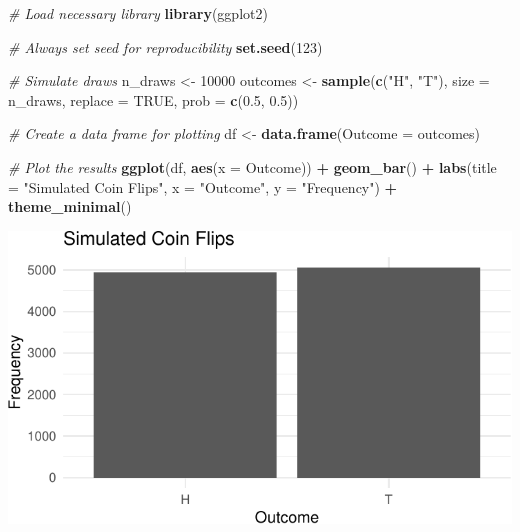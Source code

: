\documentclass[
]{book}
\newenvironment{Shaded}{\begin{snugshade}}{\end{snugshade}}
\newcommand{\AttributeTok}[1]{\textcolor[rgb]{0.13,0.29,0.53}{#1}}
\newcommand{\CommentTok}[1]{\textcolor[rgb]{0.56,0.35,0.01}{\textit{#1}}}
\newcommand{\ConstantTok}[1]{\textcolor[rgb]{0.56,0.35,0.01}{#1}}
\newcommand{\DecValTok}[1]{\textcolor[rgb]{0.00,0.00,0.81}{#1}}
\newcommand{\FloatTok}[1]{\textcolor[rgb]{0.00,0.00,0.81}{#1}}
\newcommand{\FunctionTok}[1]{\textcolor[rgb]{0.13,0.29,0.53}{\textbf{#1}}}
\newcommand{\NormalTok}[1]{#1}
\newcommand{\OtherTok}[1]{\textcolor[rgb]{0.56,0.35,0.01}{#1}}
\newcommand{\SpecialCharTok}[1]{\textcolor[rgb]{0.81,0.36,0.00}{\textbf{#1}}}
\newcommand{\StringTok}[1]{\textcolor[rgb]{0.31,0.60,0.02}{#1}}
\begin{document}
\begin{Shaded}
\begin{Highlighting}[]
\CommentTok{\# Load necessary library}
\FunctionTok{library}\NormalTok{(ggplot2)}

\CommentTok{\# Always set seed for reproducibility}
\FunctionTok{set.seed}\NormalTok{(}\DecValTok{123}\NormalTok{) }

\CommentTok{\# Simulate draws}
\NormalTok{n\_draws }\OtherTok{\textless{}{-}} \DecValTok{10000}
\NormalTok{outcomes }\OtherTok{\textless{}{-}} \FunctionTok{sample}\NormalTok{(}\FunctionTok{c}\NormalTok{(}\StringTok{"H"}\NormalTok{, }\StringTok{"T"}\NormalTok{), }\AttributeTok{size =}\NormalTok{ n\_draws, }\AttributeTok{replace =} \ConstantTok{TRUE}\NormalTok{, }\AttributeTok{prob =} \FunctionTok{c}\NormalTok{(}\FloatTok{0.5}\NormalTok{, }\FloatTok{0.5}\NormalTok{))}

\CommentTok{\# Create a data frame for plotting}
\NormalTok{df }\OtherTok{\textless{}{-}} \FunctionTok{data.frame}\NormalTok{(}\AttributeTok{Outcome =}\NormalTok{ outcomes)}

\CommentTok{\# Plot the results}
\FunctionTok{ggplot}\NormalTok{(df, }\FunctionTok{aes}\NormalTok{(}\AttributeTok{x =}\NormalTok{ Outcome)) }\SpecialCharTok{+}
  \FunctionTok{geom\_bar}\NormalTok{() }\SpecialCharTok{+}
  \FunctionTok{labs}\NormalTok{(}\AttributeTok{title =} \StringTok{"Simulated Coin Flips"}\NormalTok{, }\AttributeTok{x =} \StringTok{"Outcome"}\NormalTok{, }\AttributeTok{y =} \StringTok{"Frequency"}\NormalTok{) }\SpecialCharTok{+} 
  \FunctionTok{theme\_minimal}\NormalTok{()}
\end{Highlighting}
\end{Shaded}

\includegraphics{_main_files/figure-latex/unnamed-chunk-2-1.pdf}
\end{document}
